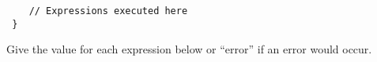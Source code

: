 \documentclass[addpoints]{exam}
\begin{document}
\begin{questions}
\begin{lstlisting}
    // Expressions executed here
 }
\end{lstlisting}

Give the value for each expression below or ``error'' if an error would occur.
\begin{multicols}{2}
\end{multicols}
\end{questions}
\end{document}
